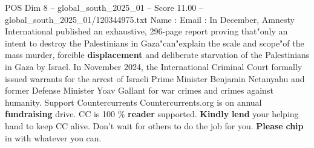 \begin{textsample}{POS Dim 8 – global\_south\_2025\_01 – Score 11.00 – global\_south\_2025\_01/120344975.txt}
Name : Email : In December, Amnesty International published an exhaustive, 296-page report proving that"only an intent to destroy the Palestinians in Gaza"can"explain the scale and scope"of the mass murder, forcible \textbf{displacement} and deliberate starvation of the Palestinians in Gaza by Israel.
In November 2024, the International Criminal Court formally issued warrants for the arrest of Israeli Prime Minister Benjamin Netanyahu and former Defense Minister Yoav Gallant for war crimes and crimes against humanity.
Support Countercurrents Countercurrents.org is on annual \textbf{fundraising} drive.
CC is 100 \% \textbf{reader} supported. \textbf{Kindly} \textbf{lend} your helping hand to keep CC alive.
Don't wait for others to do the job for you. \textbf{Please} \textbf{chip} in with whatever you can.

\end{textsample}
